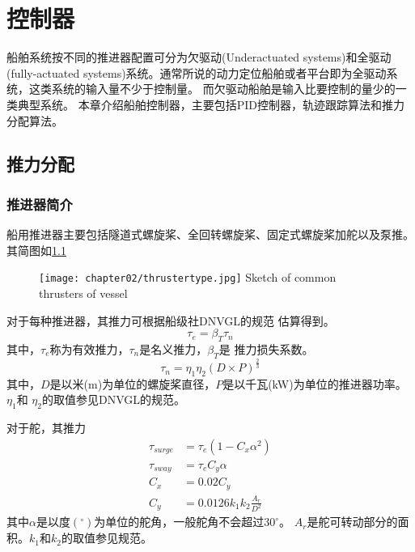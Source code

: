 


\chapter{控制器}
\label{chap:chapter02}
船舶系统按不同的推进器配置可分为欠驱动(Underactuated systems)和全驱动(fully-actuated
systems)系统。通常所说的动力定位船舶或者平台即为全驱动系统，这类系统的输入量不少于控制量。
而欠驱动船舶是输入比要控制的量少的一类典型系统。
本章介绍船舶控制器，主要包括PID控制器，轨迹跟踪算法和推力分配算法。

\section{推力分配}
\subsection{推进器简介}
船用推进器主要包括隧道式螺旋桨、全回转螺旋桨、固定式螺旋桨加舵以及泵推。其简图如\ref{fig:thrustertype}

\begin{figure}[!htp]
  \centering
  \texttt{[image: chapter02/thrustertype.jpg]}
    {Sketch of common thrusters of vessel}
  \label{fig:thrustertype}
\end{figure}

对于每种推进器，其推力可根据船级社DNVGL的规范 \cite{DNVGL2016DP}估算得到。
\begin{equation}
  \label{eq:effectivethrust}
    {\tau}_{e} = \beta_T {\tau}_{n}
\end{equation}
其中，${\tau}_{e}$称为有效推力，${\tau}_{n}$是名义推力，$\beta_T$是
推力损失系数。
\begin{equation}
  \label{eq:nominalthrust}
    {\tau}_{n} = \eta_1 \eta_2 \left(D\times P\right)^{\frac{2}{3}}
\end{equation}
其中，$D$是以米(m)为单位的螺旋桨直径，$P$是以千瓦(kW)为单位的推进器功率。$\eta_1$和
$\eta_2$的取值参见DNVGL的规范。

对于舵，其推力
\begin{equation}
  \begin{aligned}
  \label{eq:rudderthrust}
    {\tau}_{surge} &= {\tau}_e (1-C_x \alpha^2) \\
    {\tau}_{sway} &= {\tau}_e C_y \alpha \\
    C_x &= 0.02 C_y  \\
    C_y &= 0.0126 k_1 k_2 \frac{A_r}{D^2}
  \end{aligned}
\end{equation}
其中$\alpha$是以度$(^{\circ})$为单位的舵角，一般舵角不会超过$30^{\circ}$。
$A_r$是舵可转动部分的面积。$k_1$和$k_2$的取值参见规范。

